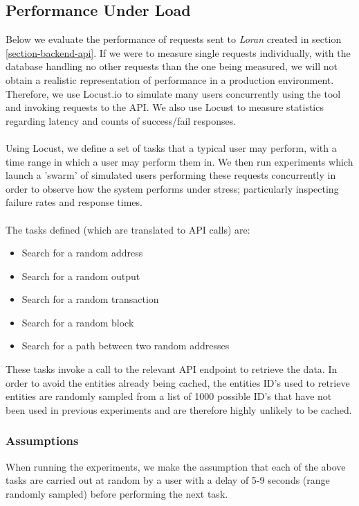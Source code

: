 \subsection{Performance Under Load}\label{evaluation:performance-under-load}
Below we evaluate the performance of requests sent to \textit{Loran} created in section \ref{section-backend-api}. If we were to measure single requests individually, with the database handling no other requests than the one being measured, we will not obtain a realistic representation of performance in a production environment. Therefore, we use Locust.io to simulate many users concurrently using the tool and invoking requests to the API. We also use Locust to measure statistics regarding latency and counts of success/fail responses. 
\\\\
Using Locust, we define a set of tasks that a typical user may perform, with a time range in which a user may perform them in. We then run experiments which launch a 'swarm' of simulated users performing these requests concurrently in order to observe how the system performs under stress; particularly inspecting failure rates and response times.
\\\\
The tasks defined (which are translated to API calls) are:
\begin{itemize}
    \item Search for a random address
    \item Search for a random output
    \item Search for a random transaction 
    \item Search for a random block
    \item Search for a path between two random addresses
\end{itemize}
These tasks invoke a call to the relevant API endpoint to retrieve the data. In order to avoid the entities already being cached, the entities ID's used to retrieve entities are randomly sampled from a list of 1000 possible ID's that have not been used in previous experiments and are therefore highly unlikely to be cached. 

\subsubsection{Assumptions}
When running the experiments, we make the assumption that each of the above tasks are carried out at random by a user with a delay of 5-9 seconds (range randomly sampled) before performing the next task. 

